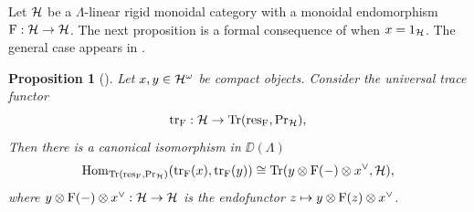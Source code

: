 \documentclass[a4paper, 10pt, oneside, reqno]{amsart}
\theoremstyle{plain}
\newtheorem{prop}[thm]{Proposition}
\theoremstyle{definition}
\theoremstyle{remark}
\newcommand{\Prr}{\mathrm{Pr}}
\newcommand{\restr}{\mathrm{res}}
\begin{document}
Let $\mathcal{H}$ be a $\Lambda$-linear rigid monoidal category with a monoidal endomorphism $\mathrm{F} : \mathcal{H} \to \mathcal{H}$. The next proposition is a formal consequence of \cite[Theorem 3.8.5]{ToyModel} when $x = 1_{\mathcal{H}}$. The general case appears in \cite{ZhuCategoricalTame}.

\begin{prop}[]\label{prop:computing-in-the-trace}
Let $x,y \in \mathcal{H}^{\omega}$ be compact objects. Consider the universal trace functor 
$$\tr_{\Frob} : \Hcal \to \Tr(\restr_{\Frob}, \Prr_{\Hcal}),$$
Then there is a canonical isomorphism in $\DD(\Lambda)$
$$\Hom_{\Tr(\restr_{\Frob}, \Prr_{\Hcal})}(\tr_{\Frob}(x), \tr_{\Frob}(y)) \cong \Tr(y \otimes \Frob(-) \otimes x^{\vee}, \Hcal),$$
where $y \otimes \mathrm{F}(-) \otimes x^{\vee} : \mathcal{H} \to \mathcal{H}$ is the endofunctor $z \mapsto y \otimes \mathrm{F}(z) \otimes x^{\vee}$. 
\end{prop}



\begingroup\raggedright

\endgroup
\end{document}

